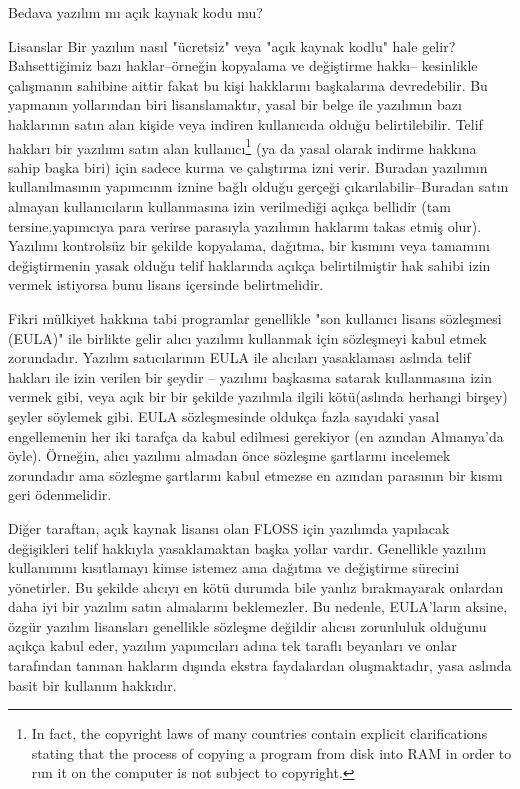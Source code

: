 \begin{section}{Bedava yazılım mı açık kaynak kodu mu?}
\begin{subsection}{Lisanslar}
Bir yazılım nasıl  "ücretsiz" veya "açık kaynak kodlu" hale gelir?  Bahsettiğimiz bazı haklar--örneğin kopyalama ve değiştirme hakkı-- kesinlikle çalışmanın sahibine aittir fakat bu kişi hakklarını başkalarına devredebilir. Bu yapmanın  yollarından biri lisanslamaktır, yasal bir belge ile yazılımın bazı haklarının satın alan kişide veya indiren kullanıcıda olduğu belirtilebilir. Telif hakları bir yazılımı satın alan kullanıcı\footnote{In fact, the copyright laws of many countries contain explicit clarifications stating that the process of copying a program from disk into RAM in order to run it on the computer is not subject to copyright.} (ya da yasal olarak indirme hakkına sahip başka biri) için sadece kurma ve çalıştırma izni verir. Buradan yazılımın kullanılmasının yapımcının iznine bağlı olduğu gerçeği çıkarılabilir--Buradan satın almayan kullanıcıların kullanmasına izin verilmediği açıkça bellidir (tam tersine.yapımcıya para verirse parasıyla yazılımın haklarını takas etmiş olur). Yazılımı kontrolsüz bir şekilde  kopyalama, dağıtma, bir kısmını veya tamamını değiştirmenin yasak olduğu telif haklarında açıkça belirtilmiştir hak sahibi izin vermek istiyorsa bunu lisans içersinde belirtmelidir.

Fikri mülkiyet hakkına tabi programlar genellikle "son kullanıcı lisans sözleşmesi (EULA)" ile birlikte gelir alıcı yazılımı kullanmak için  sözleşmeyi kabul etmek zorundadır. Yazılım satıcılarının EULA ile  alıcıları yasaklaması aslında telif hakları ile izin verilen bir şeydir -- yazılımı başkasına  satarak kullanmasına izin vermek gibi, veya açık bir bir şekilde yazılımla ilgili kötü(aslında herhangi birşey) şeyler söylemek gibi. EULA  sözleşmesinde oldukça fazla sayıdaki yasal engellemenin her iki tarafça da kabul edilmesi gerekiyor (en azından Almanya'da öyle). Örneğin, alıcı yazılımı almadan önce sözleşme şartlarını incelemek zorundadır ama sözleşme şartlarını kabul etmezse en azından parasının bir kısmı geri ödenmelidir.

Diğer taraftan, açık kaynak lisansı olan FLOSS için yazılımda yapılacak değişikleri telif hakkıyla yasaklamaktan başka yollar vardır. Genellikle yazılım kullanımını kısıtlamayı kimse istemez ama dağıtma ve değiştirme sürecini yönetirler. Bu şekilde alıcıyı en kötü durumda bile yanlız bırakmayarak onlardan daha iyi bir yazılım satın almalarını beklemezler. Bu nedenle, EULA'ların aksine, özgür yazılım lisansları genellikle sözleşme değildir alıcısı zorunluluk olduğunu açıkça kabul eder, yazılım yapımcıları adına tek taraflı beyanları ve onlar tarafından tanınan hakların dışında ekstra faydalardan oluşmaktadır, yasa aslında basit bir kullanım hakkıdır.


\end{subsection}
\end{section}
